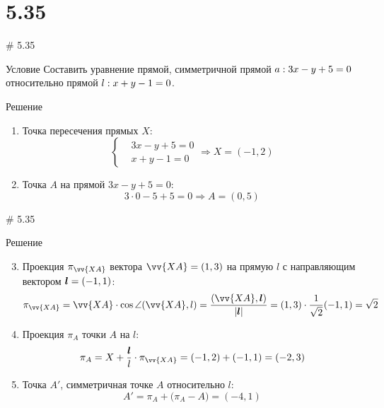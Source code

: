 \documentclass[russian]{beamer}
\begin{document}
  \section{5.35}
  
  \begin{frame}{\# 5.35}
    \begin{block}{Условие}
      Составить уравнение прямой, симметричной прямой $a: 3x \hm- y \hm+ 5 \hm= 0$ относительно прямой $l: x \hm+ y \hm- 1 \hm= 0$.
    \end{block}
    
    \pause
    
    \begin{block}{Решение}
      
      \begin{enumerate}
        \item Точка пересечения прямых $X$:
        \[
          \left\{\begin{aligned}
            &3x - y + 5 = 0\\
            &x + y - 1 = 0
          \end{aligned}\right.
          \Rightarrow X = (-1, 2)
        \]
        
        \pause
        
        \item Точка $A$ на прямой $3x - y + 5 = 0$:
        \[
          3 \cdot 0 - 5 + 5 = 0
          \Rightarrow A = (0, 5)
        \]
      \end{enumerate}
    \end{block}
  \end{frame}
    
    
  \begin{frame}{\# 5.35}
    \begin{block}{Решение}
        
      \begin{enumerate}
         \setcounter{enumi}{2}
          
          \item Проекция $\pi_{\vv{XA}}$ вектора $\vv{XA} \hm= (1, 3)$ на прямую $l$ с направляющим вектором $\boldsymbol l = (-1, 1)$:
          \[
            \pi_{\vv{XA}} = \vv{XA} \cdot \cos \angle(\vv{XA}, l)
            = \frac{(\vv{XA}, \bds l)}{|\bds l|}
            = (1, 3) \cdot \frac{1}{\sqrt 2} (-1, 1)
            = \sqrt 2
          \]
          
          \pause
          
          \item Проекция $\pi_A$ точки $A$ на $l$:
          \[
            \pi_A = X + \frac{\bds l}{l} \cdot \pi_{\vv{XA}}
            = (-1, 2) + (-1, 1) = (-2, 3)
          \]
          
          \pause
          
          \item Точка $A'$, симметричная точке $A$ относительно $l$:
          \[
            A' = \pi_A + \bigl(\pi_A - A\bigr) = (-4, 1)
          \]
      \end{enumerate}
    \end{block}
  \end{frame}
        
\end{document}
